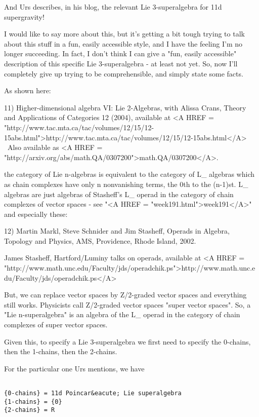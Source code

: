 And Urs describes, in his blog, the relevant Lie 3-superalgebra
for 11d supergravity!

I would like to say more about this, but it's getting a bit 
tough trying to talk about this stuff in a fun, easily accessible 
style, and I have the feeling I'm no longer succeeding.  In fact,
I don't think I can give a "fun, easily accessible" description 
of this specific Lie 3-superalgebra - at least not yet.  So, 
now I'll completely give up trying to be comprehensible, and simply 
state some facts.

As shown here:

11) Higher-dimensional algebra VI: Lie 2-Algebras, with Alissa
Crans, Theory and Applications of Categories 12 (2004),
available at <A HREF = "http://www.tac.mta.ca/tac/volumes/12/15/12-15abs.html">http://www.tac.mta.ca/tac/volumes/12/15/12-15abs.html</A> \ 
Also available as <A HREF = "http://arxiv.org/abs/math.QA/0307200">math.QA/0307200</A>.

the category of Lie n-algebras is equivalent to the category
of L_{\infty } algebras which as chain complexes have only n
nonvanishing terms, the 0th to the (n-1)st.  L_{\infty } algebras
are just algebras of Stasheff's L_{\infty } operad in the category
of chain complexes of vector spaces - see "<A HREF = "week191.html">week191</A>"
and especially these:

12) Martin Markl, Steve Schnider and Jim Stasheff, Operads in Algebra,
Topology and Physics, AMS, Providence, Rhode Island, 2002.

James Stasheff, Hartford/Luminy talks on operads, available at 
<A HREF = "http://www.math.unc.edu/Faculty/jds/operadchik.ps">http://www.math.unc.edu/Faculty/jds/operadchik.ps</A>

But, we can replace vector spaces by Z/2-graded vector spaces and
everything still works.  Physicists call Z/2-graded vector spaces
"super vector spaces".  So, a "Lie n-superalgebra"
is an algebra of the L_{\infty } operad in the category of
chain complexes of super vector spaces.

Given this, to specify a Lie 3-superalgebra we first need to
specify the 0-chains, then the 1-chains, then the 2-chains.  

For the particular one Urs mentions, we have


\begin{verbatim}

{0-chains} = 11d Poincar&eacute; Lie superalgebra
{1-chains} = {0}
{2-chains} = R
\end{verbatim}
    

